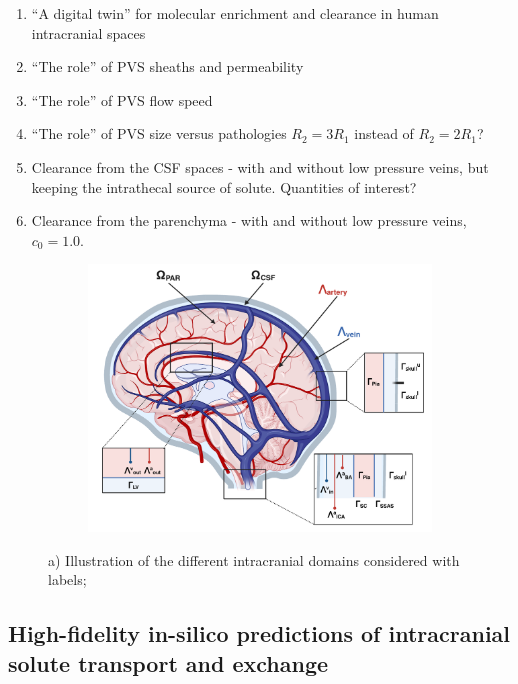 \documentclass[fleqn,10pt]{wlscirep}
\begin{document}
\begin{enumerate}
\item
  ``A digital twin'' for molecular enrichment and clearance in human intracranial spaces
\item
  ``The role'' of PVS sheaths and permeability
\item
  ``The role'' of PVS flow speed
\item
  ``The role'' of PVS size versus pathologies $R_2 = 3 R_1$ instead of $R_2 = 2 R_1$?
\item
  Clearance from the CSF spaces - with and without low pressure veins, but keeping the intrathecal source of solute. Quantities of interest?
\item
  Clearance from the parenchyma - with and without low pressure veins, $c_0 = 1.0$.
\end{enumerate}

\begin{figure}
     \begin{subfigure}[b]{0.45\textwidth}
         \centering
         \includegraphics[width=\textwidth]{figures/Brain-PVS-callouts.pdf}
     \end{subfigure}
     \hfill
     \caption{a) Illustration of the different intracranial domains
       considered with labels;}
     \label{fig:intracranial_domains}
\end{figure}


\subsection*{High-fidelity in-silico predictions of intracranial solute transport and exchange}
\end{document}
